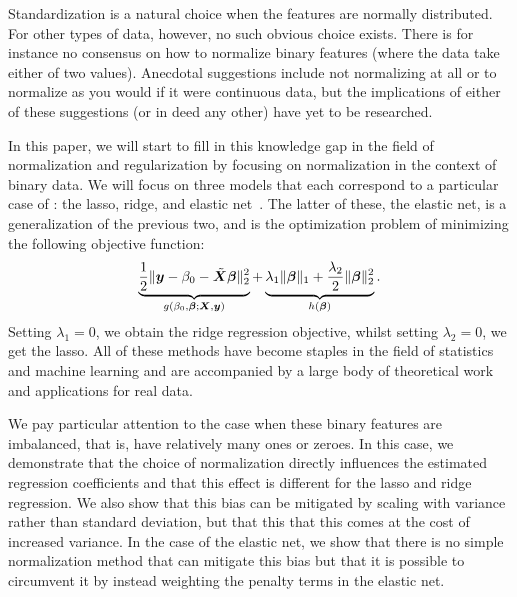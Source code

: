 Standardization is a natural choice when the features are normally distributed. For other
types of data, however, no such obvious choice exists. There is for instance no consensus
on how to normalize binary features (where the data take either of two values). Anecdotal
suggestions include not normalizing at all or to normalize as you would if it were
continuous data, but the implications of either of these suggestions (or in deed any other)
have yet to be researched.

In this paper, we will start to fill in this knowledge gap in the field of normalization
and regularization by focusing on normalization in the context of binary data. We will
focus on three models that each correspond to a particular case of
: the lasso, ridge, and elastic net~\citep{zou2005}. The latter
of these, the elastic net, is a generalization of the previous two, and is the optimization
problem of minimizing the following objective function:
\begin{equation*}
  \underbrace{\frac{1}{2} \lVert \boldsymbol y - \beta_0 - \tilde{\boldsymbol{X}}\boldsymbol{\beta} \rVert^2_2}_{g(\beta_0, \boldsymbol{\beta}; \boldsymbol{X}, \boldsymbol{y})}  + \underbrace{\lambda_1 \lVert \boldsymbol\beta \rVert_1 + \frac{\lambda_2}{2}\lVert \boldsymbol \beta \rVert_2^2}_{h(\boldsymbol{\beta})}.
\end{equation*}
%
Setting \(\lambda_1 = 0\), we obtain the ridge regression objective, whilst setting
\(\lambda_2 = 0\), we get the lasso. All of these methods have become staples in the field
of statistics and machine learning and are accompanied by a large body of theoretical work
and applications for real data.

We pay particular attention to the case when these binary features are imbalanced, that is,
have relatively many ones or zeroes. In this case, we demonstrate that the choice of
normalization directly influences the estimated regression coefficients and that this
effect is different for the lasso and ridge regression. We also show that this bias can be
mitigated by scaling with variance rather than standard deviation, but that this that this
comes at the cost of increased variance. In the case of the elastic net, we show that there
is no simple normalization method that can mitigate this bias but that it is possible to
circumvent it by instead weighting the penalty terms in the elastic net.

